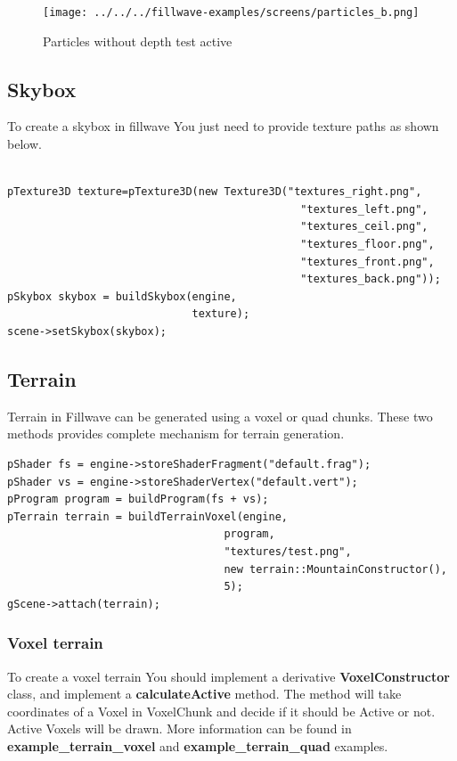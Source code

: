 \documentclass{article}
\begin{document}
\begin{figure}
    \centering
    \texttt{[image: ../../../fillwave-examples/screens/particles\_b.png]}
    \caption{Particles without depth test active}
    \label{particle_no_depth_test}
\end{figure}

\newpage

\subsection{Skybox}\label{sec:Skybox}

\indent \indent To create a skybox in fillwave You just need to provide texture paths as shown below.

\begin{lstlisting}

pTexture3D texture=pTexture3D(new Texture3D("textures_right.png",
                                              "textures_left.png",
                                              "textures_ceil.png",
                                              "textures_floor.png",
                                              "textures_front.png",
                                              "textures_back.png"));
pSkybox skybox = buildSkybox(engine,
                             texture);
scene->setSkybox(skybox);
\end{lstlisting}

\subsection{Terrain}\label{sec:Terrain}
\indent \indent Terrain in Fillwave can be generated using a voxel or quad chunks. These two methods provides complete mechanism for terrain generation.


\begin{lstlisting}
pShader fs = engine->storeShaderFragment("default.frag");
pShader vs = engine->storeShaderVertex("default.vert");
pProgram program = buildProgram(fs + vs);
pTerrain terrain = buildTerrainVoxel(engine,
                                  program,
                                  "textures/test.png",
                                  new terrain::MountainConstructor(),
                                  5);
gScene->attach(terrain);
\end{lstlisting}

\subsubsection{Voxel terrain}\label{sec:Voxel terrain}
\indent \indent To create a voxel terrain You should implement a derivative \textbf{VoxelConstructor} class, and implement a \textbf{calculateActive} method. The method will take coordinates of a Voxel in VoxelChunk and decide if it should be Active or not. Active Voxels will be drawn. More information can be found in \textbf{example\_terrain\_voxel} and \textbf{example\_terrain\_quad} examples.
\end{document}
